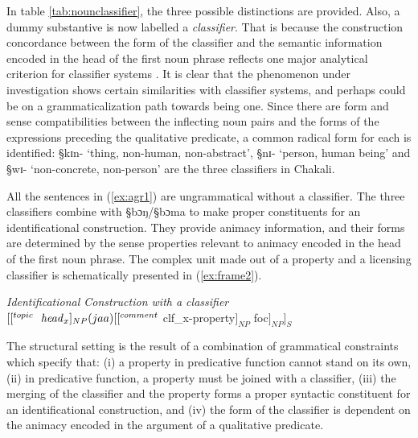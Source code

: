 
In table \ref{tab:nounclassifier}, the three possible
distinctions are provided. Also, a dummy substantive is now labelled a {\it
classifier}.  That is because the construction
concordance between the form of
the  classifier and the semantic information encoded in the head of the
first noun phrase reflects one major analytical criterion for  
classifier systems \citep{Dixo86, Corb91, Grin00}. It is clear that the
phenomenon
under investigation shows certain similarities with  
classifier systems, and perhaps could be on a grammaticalization path towards
 being one. Since there are form and sense compatibilities between the
inflecting noun pairs 
and the forms of the expressions preceding the qualitative predicate,  a common 
radical form for each is identified: {\S kɪn}-
{ } `thing, non-human, non-abstract',  {\S nɪ-} {\sc
 [hum] } `person, human being'  and  {\S wɪ-} {\sc  [abst] } `non-concrete,
non-person' are the three classifiers in Chakali. 


All the sentences in (\ref{ex:agr1}) are ungrammatical without a classifier. The
three classifiers  combine with {\S bɔŋ}/{\S bɔma}  to  make  proper
constituents for an identificational construction. They  provide
animacy information, and their forms are determined by the sense properties
relevant
to animacy  encoded in the head of the first noun phrase.  The complex unit made
out of  a property and a licensing classifier is schematically presented
in (\ref{ex:frame2}).  


\begin{exe}
\ex\label{ex:frame2}\textit{Identificational Construction with a classifier}\\

 $[ [^{topic} \ \ {\it head}_{x}  ]_{NP} (jaa)[[^{comment}${\sc
clf}_{x}-property$]_{NP}$ {\sc foc}$]_{NP}]_{S}$
\end{exe}



The structural setting  is the result of a combination of grammatical
constraints which specify that: (i) a property in predicative function cannot
stand on its own, (ii) in predicative function,  a property must be joined with
a classifier, (iii) the merging of the classifier and the property forms a
proper syntactic constituent for an identificational construction, and (iv) the
form of the classifier is dependent on the animacy encoded in the argument of a
qualitative predicate. 

